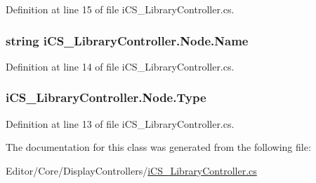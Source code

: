 Definition at line 15 of file i\+C\+S\+\_\+\+Library\+Controller.\+cs.

\hypertarget{classi_c_s___library_controller_1_1_node_a4110b68b5d99a272b06807aee8c0850c}{
\subsubsection[{Name}]{\setlength{\rightskip}{0pt plus 5cm}string i\+C\+S\+\_\+\+Library\+Controller.\+Node.\+Name}}\label{classi_c_s___library_controller_1_1_node_a4110b68b5d99a272b06807aee8c0850c}


Definition at line 14 of file i\+C\+S\+\_\+\+Library\+Controller.\+cs.

\hypertarget{classi_c_s___library_controller_1_1_node_a73aa9c7d6f45184c3e7c530e26bbee78}{
\subsubsection[{Type}]{ i\+C\+S\+\_\+\+Library\+Controller.\+Node.\+Type}}\label{classi_c_s___library_controller_1_1_node_a73aa9c7d6f45184c3e7c530e26bbee78}


Definition at line 13 of file i\+C\+S\+\_\+\+Library\+Controller.\+cs.



The documentation for this class was generated from the following file\+:\begin{DoxyCompactItemize}
\item 
Editor/\+Core/\+Display\+Controllers/\hyperlink{i_c_s___library_controller_8cs}{i\+C\+S\+\_\+\+Library\+Controller.\+cs}\end{DoxyCompactItemize}
